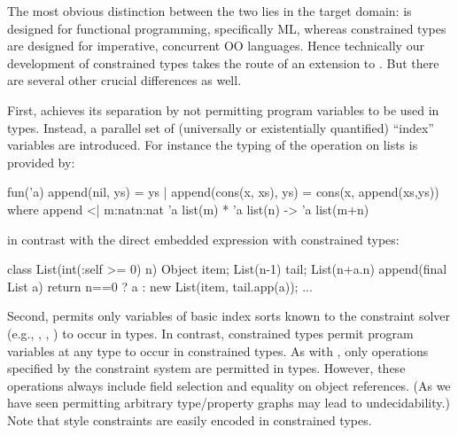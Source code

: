 The most obvious distinction between the two lies in the target
domain: \DML{} is designed for functional programming, specifically
ML, whereas constrained types are designed for imperative, concurrent
OO languages. Hence technically our development of constrained types
takes the route of an extension to \FJ. But there are several other
crucial differences as well.

  {\lstset{language=ML,basicstyle=\tt,tabsize=4,columns=fullflexible,captionpos=b,xleftmargin=1em,xrightmargin=1em,keywordstyle=,keepspaces}}
  {}

First, \DML{} achieves its separation by not permitting program
variables to be used in types. Instead, a parallel set of (universally
or existentially quantified) ``index'' variables are
introduced. For instance the typing of the  operation on
lists is provided by:
\begin{displayml}
fun('a)
  append(nil, ys) = ys
| append(cons(x, xs), ys)
    = cons(x, append(xs,ys))
where append <| {m:nat}{n:nat} 
    'a list(m) * 'a list(n) -> 'a list(m+n)  
\end{displayml}
\noindent in contrast with the direct embedded expression with constrained types:
\begin{displayxten}
class List(int(:self >= 0) n) {
  Object item;
  List(n-1) tail;
  List(n+a.n) append(final List a) { 
    return n==0
      ? a : new List(item, tail.app(a));
  }
  ...
}
\end{displayxten}

Second, \DML{} permits only variables of basic index sorts known to
the constraint solver (e.g., , , ) to
occur in types. In contrast, constrained types permit program
variables at any type to occur in constrained types. As with \DML,
only operations specified by the constraint system are permitted in
types. However, these operations always include field selection and
equality on object references.  (As we have seen permitting arbitrary
type/property graphs may lead to undecidability.) Note that \DML{}
style constraints are easily encoded in constrained types.



